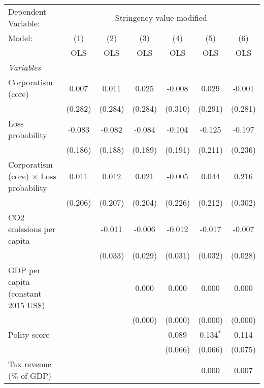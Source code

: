 
\begingroup
\centering
\begin{tabular}{lcccccc}
   \toprule
   Dependent Variable: & \multicolumn{6}{c}{Stringency value modified}\\
   Model:                                        & (1)     & (2)     & (3)     & (4)     & (5)         & (6)\\  
                                                 &  OLS    & OLS     & OLS     & OLS     & OLS         & OLS\\  
   \midrule
   \emph{Variables}\\
   Corporatism (core)                            & 0.007   & 0.011   & 0.025   & -0.008  & 0.029       & -0.001\\   
                                                 & (0.282) & (0.284) & (0.284) & (0.310) & (0.291)     & (0.281)\\   
   Loss probability                              & -0.083  & -0.082  & -0.084  & -0.104  & -0.125      & -0.197\\   
                                                 & (0.186) & (0.188) & (0.189) & (0.191) & (0.211)     & (0.236)\\   
   Corporatism (core) $\times$ Loss probability  & 0.011   & 0.012   & 0.021   & -0.005  & 0.044       & 0.216\\   
                                                 & (0.206) & (0.207) & (0.204) & (0.226) & (0.212)     & (0.302)\\   
   CO2 emissions per capita                      &         & -0.011  & -0.006  & -0.012  & -0.017      & -0.007\\   
                                                 &         & (0.033) & (0.029) & (0.031) & (0.032)     & (0.028)\\   
   GDP per capita (constant 2015 US\$)           &         &         & 0.000   & 0.000   & 0.000       & 0.000\\   
                                                 &         &         & (0.000) & (0.000) & (0.000)     & (0.000)\\   
   Polity score                                  &         &         &         & 0.089   & 0.134$^{*}$ & 0.114\\   
                                                 &         &         &         & (0.066) & (0.066)     & (0.075)\\   
   Tax revenue (\% of GDP)                       &         &         &         &         & 0.000       & 0.007\\   

\end{tabular}
